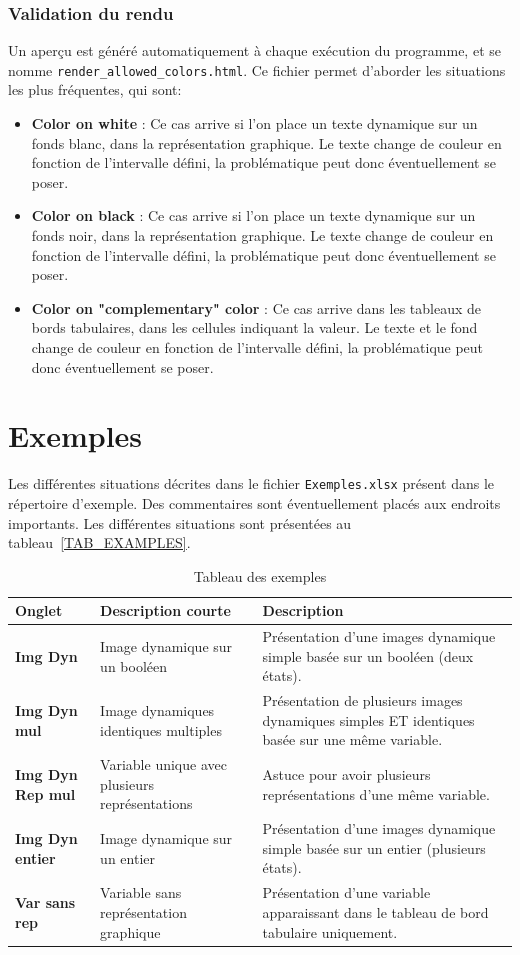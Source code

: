\documentclass{AlstomLibrary}
\begin{document}
\subsection{Validation du rendu}

 Un aperçu est généré automatiquement à chaque exécution du programme, et se nomme  \texttt{render\_allowed\_colors.html}. Ce fichier permet d'aborder les situations les plus fréquentes, qui sont:
 \begin{itemize}
\item \textbf{Color on white} : Ce cas arrive si l'on place un texte dynamique sur un fonds blanc, dans la représentation graphique. Le texte change de couleur en fonction de l'intervalle défini, la problématique peut donc éventuellement se poser.
\item \textbf{Color on black} : Ce cas arrive si l'on place un texte dynamique sur un fonds noir, dans la représentation graphique. Le texte change de couleur en fonction de l'intervalle défini, la problématique peut donc éventuellement se poser.
\item \textbf{Color on "complementary" color} : Ce cas arrive dans les tableaux de bords tabulaires, dans les cellules indiquant la valeur. Le texte et le fond change de couleur en fonction de l'intervalle défini, la problématique peut donc éventuellement se poser.
\end{itemize}

\chapter{Exemples}

Les différentes situations décrites dans le fichier \texttt{Exemples.xlsx} présent dans le répertoire d'exemple. Des commentaires sont éventuellement placés aux endroits importants. Les différentes situations sont présentées au tableau~\vref{TAB_EXAMPLES}.

\begin{table}[htbp]\centering
\begin{tabular}{@{}lp{4.5cm}p{7cm}}  \toprule%
Onglet & Description courte & Description  \\
\midrule
\textbf{Img Dyn} & Image dynamique sur un booléen  & Présentation d'une images dynamique simple basée sur un booléen (deux états). \\
\textbf{Img Dyn mul} & Image dynamiques identiques multiples & Présentation de plusieurs images dynamiques simples ET identiques basée sur une même variable.  \\
\textbf{Img Dyn Rep mul} & Variable unique avec plusieurs représentations  & Astuce pour avoir plusieurs représentations d'une même variable.  \\
\textbf{Img Dyn entier} & Image dynamique sur un entier  & Présentation d'une images dynamique simple basée sur un entier (plusieurs états).  \\
\textbf{Var sans rep} &Variable sans représentation graphique &  Présentation d'une variable apparaissant dans le tableau de bord tabulaire uniquement. \\
\bottomrule
\end{tabular}
\caption{Tableau des exemples}\label{TAB_EXAMPLES}
\end{table}
\end{document}

